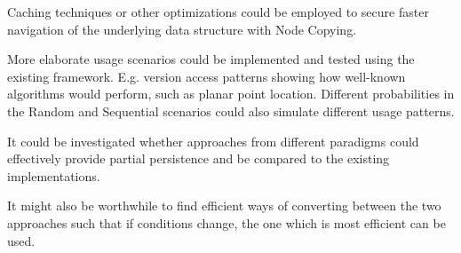 Caching techniques or other optimizations could be employed to secure faster
navigation of the underlying data structure with Node Copying.

More elaborate usage scenarios could be implemented and tested using the
existing framework. E.g. version access patterns showing how well-known
algorithms would perform, such as planar point location. Different probabilities
in the Random and Sequential scenarios could also simulate different usage
patterns.

It could be investigated whether approaches from different paradigms could
effectively provide partial persistence and be compared to the existing
implementations.

It might also be worthwhile to find efficient ways of converting between the two
approaches such that if conditions change, the one which is most efficient can
be used.
